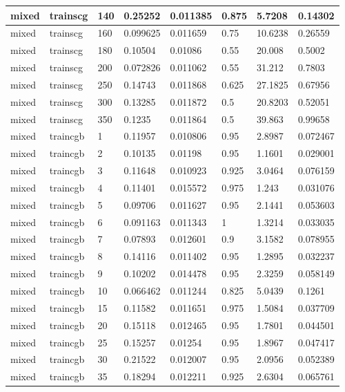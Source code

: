 \begin{longtable}{llllllll}
mixed & trainscg & 140 & 0.25252 & 0.011385 & 0.875 & 5.7208 & 0.14302 \\ \hline 
mixed & trainscg & 160 & 0.099625 & 0.011659 & 0.75 & 10.6238 & 0.26559 \\ \hline 
mixed & trainscg & 180 & 0.10504 & 0.01086 & 0.55 & 20.008 & 0.5002 \\ \hline 
mixed & trainscg & 200 & 0.072826 & 0.011062 & 0.55 & 31.212 & 0.7803 \\ \hline 
mixed & trainscg & 250 & 0.14743 & 0.011868 & 0.625 & 27.1825 & 0.67956 \\ \hline 
mixed & trainscg & 300 & 0.13285 & 0.011872 & 0.5 & 20.8203 & 0.52051 \\ \hline 
mixed & trainscg & 350 & 0.1235 & 0.011864 & 0.5 & 39.863 & 0.99658 \\ \hline 
mixed & traincgb & 1 & 0.11957 & 0.010806 & 0.95 & 2.8987 & 0.072467 \\ \hline 
mixed & traincgb & 2 & 0.10135 & 0.01198 & 0.95 & 1.1601 & 0.029001 \\ \hline 
mixed & traincgb & 3 & 0.11648 & 0.010923 & 0.925 & 3.0464 & 0.076159 \\ \hline 
mixed & traincgb & 4 & 0.11401 & 0.015572 & 0.975 & 1.243 & 0.031076 \\ \hline 
mixed & traincgb & 5 & 0.09706 & 0.011627 & 0.95 & 2.1441 & 0.053603 \\ \hline 
mixed & traincgb & 6 & 0.091163 & 0.011343 & 1 & 1.3214 & 0.033035 \\ \hline 
mixed & traincgb & 7 & 0.07893 & 0.012601 & 0.9 & 3.1582 & 0.078955 \\ \hline 
mixed & traincgb & 8 & 0.14116 & 0.011402 & 0.95 & 1.2895 & 0.032237 \\ \hline 
mixed & traincgb & 9 & 0.10202 & 0.014478 & 0.95 & 2.3259 & 0.058149 \\ \hline 
mixed & traincgb & 10 & 0.066462 & 0.011244 & 0.825 & 5.0439 & 0.1261 \\ \hline 
mixed & traincgb & 15 & 0.11582 & 0.011651 & 0.975 & 1.5084 & 0.037709 \\ \hline 
mixed & traincgb & 20 & 0.15118 & 0.012465 & 0.95 & 1.7801 & 0.044501 \\ \hline 
mixed & traincgb & 25 & 0.15257 & 0.01254 & 0.95 & 1.8967 & 0.047417 \\ \hline 
mixed & traincgb & 30 & 0.21522 & 0.012007 & 0.95 & 2.0956 & 0.052389 \\ \hline 
mixed & traincgb & 35 & 0.18294 & 0.012211 & 0.925 & 2.6304 & 0.065761 \\ \hline 

\end{longtable}
